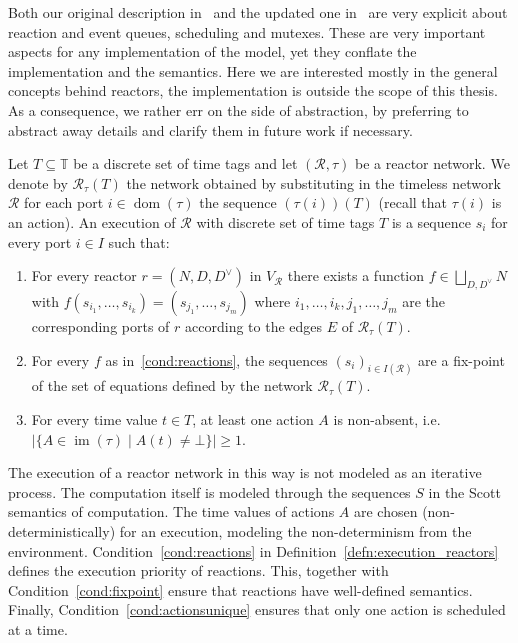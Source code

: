 Both our original description in~\cite{lohstroh_cyphy19} and the updated one in~\cite{lohstroh_phdthesis} are very explicit about reaction and event queues, scheduling and mutexes.
These are very important aspects for any implementation of the model, yet they conflate the implementation and the semantics.
Here we are interested mostly in the general concepts behind reactors, the implementation is outside the scope of this thesis.
As a consequence, we rather err on the side of abstraction, by preferring to abstract away details and clarify them in future work if necessary. 

\begin{defn}
    \label{defn:execution_reactors}
Let $T \subseteq \mathbb{T}$ be a discrete set of time tags and let $(\mathcal{R},\tau)$ be a reactor network.
We denote by $\mathcal{R}_\tau(T)$ the network obtained by substituting in the timeless network $\mathcal{R}$ for each port $i \in \operatorname{dom}(\tau)$ the sequence $(\tau(i))(T)$ (recall that $\tau(i)$ is an action).
An execution of $\mathcal{R}$ with discrete set of time tags $T$ is a sequence $s_i$ for every port $i \in I$ such that: 
\begin{enumerate}
    \item\label{cond:reactions} For every reactor $r = (N,D,D^\vee)$ in $V_\mathcal{R}$ there exists a function $f \in \bigsqcup_{D,D^\vee}N$ with $f(s_{i_1},\ldots,s_{i_k}) = (s_{j_1},\ldots,s_{j_m})$ where $i_1,\ldots,i_k,j_1,\ldots,j_m$ are the corresponding ports of $r$ according to the edges $E$ of $\mathcal{R}_\tau(T)$.
    \item\label{cond:fixpoint} For every $f$ as in~\ref{cond:reactions}, the sequences $(s_i)_{i \in I(\mathcal{R})}$ are a fix-point of the set of equations defined by the network $\mathcal{R}_\tau(T)$.
    \item\label{cond:actionsunique} For every time value $t \in T$, at least one action $A$ is non-absent, i.e. $| \{ A  \in \operatorname{im}(\tau) \mid A(t) \neq \bot \}| \geq 1$.
\end{enumerate}
\end{defn}

The execution of a reactor network in this way is not modeled as an iterative process.
The computation itself is modeled through the sequences $S$ in the Scott semantics of computation.
The time values of actions $A$ are chosen (non-deterministically) for an execution, modeling the non-determinism from the environment.
Condition~\ref{cond:reactions} in Definition~\ref{defn:execution_reactors} defines the execution priority of reactions. This, together with Condition~\ref{cond:fixpoint} ensure that reactions have well-defined semantics.
Finally, Condition~\ref{cond:actionsunique} ensures that only one action is scheduled at a time.

